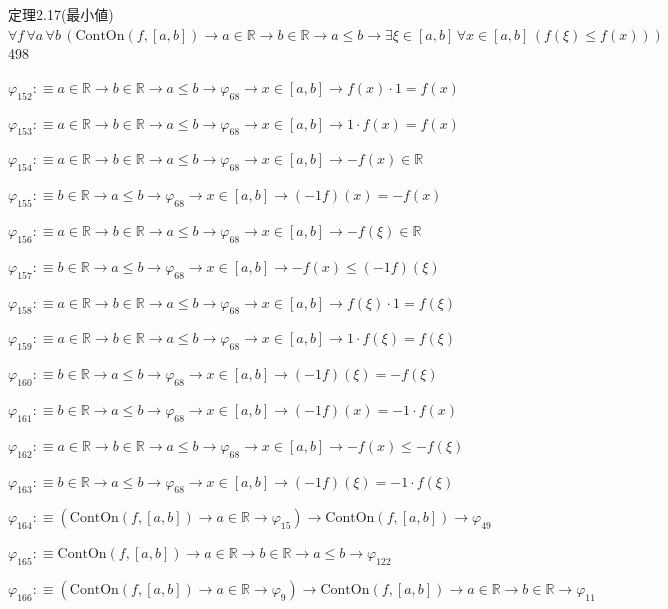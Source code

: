 \begin{fullproof}{定理2.17(最小値)}{$\forall f\,\forall a\,\forall b\,(\mathrm{ContOn}(f,[a,b]) \to a \in \mathbb{R} \to b \in \mathbb{R} \to a \leq b \to \exists \xi \in [a,b]\,\forall x \in [a,b]\,(f(\xi) \leq f(x)))$}{498}
\begin{abbrevlist}
\item $\varphi_{152} :\equiv a \in \mathbb{R} \to b \in \mathbb{R} \to a \leq b \to \varphi_{68} \to x \in [a,b] \to f(x) \cdot 1 = f(x)$
\item $\varphi_{153} :\equiv a \in \mathbb{R} \to b \in \mathbb{R} \to a \leq b \to \varphi_{68} \to x \in [a,b] \to 1 \cdot f(x) = f(x)$
\item $\varphi_{154} :\equiv a \in \mathbb{R} \to b \in \mathbb{R} \to a \leq b \to \varphi_{68} \to x \in [a,b] \to -f(x) \in \mathbb{R}$
\item $\varphi_{155} :\equiv b \in \mathbb{R} \to a \leq b \to \varphi_{68} \to x \in [a,b] \to (-1 f)(x) = -f(x)$
\item $\varphi_{156} :\equiv a \in \mathbb{R} \to b \in \mathbb{R} \to a \leq b \to \varphi_{68} \to x \in [a,b] \to -f(\xi) \in \mathbb{R}$
\item $\varphi_{157} :\equiv b \in \mathbb{R} \to a \leq b \to \varphi_{68} \to x \in [a,b] \to -f(x) \leq (-1 f)(\xi)$
\item $\varphi_{158} :\equiv a \in \mathbb{R} \to b \in \mathbb{R} \to a \leq b \to \varphi_{68} \to x \in [a,b] \to f(\xi) \cdot 1 = f(\xi)$
\item $\varphi_{159} :\equiv a \in \mathbb{R} \to b \in \mathbb{R} \to a \leq b \to \varphi_{68} \to x \in [a,b] \to 1 \cdot f(\xi) = f(\xi)$
\item $\varphi_{160} :\equiv b \in \mathbb{R} \to a \leq b \to \varphi_{68} \to x \in [a,b] \to (-1 f)(\xi) = -f(\xi)$
\item $\varphi_{161} :\equiv b \in \mathbb{R} \to a \leq b \to \varphi_{68} \to x \in [a,b] \to (-1 f)(x) = -1 \cdot f(x)$
\item $\varphi_{162} :\equiv a \in \mathbb{R} \to b \in \mathbb{R} \to a \leq b \to \varphi_{68} \to x \in [a,b] \to -f(x) \leq -f(\xi)$
\item $\varphi_{163} :\equiv b \in \mathbb{R} \to a \leq b \to \varphi_{68} \to x \in [a,b] \to (-1 f)(\xi) = -1 \cdot f(\xi)$
\item $\varphi_{164} :\equiv (\mathrm{ContOn}(f,[a,b]) \to a \in \mathbb{R} \to \varphi_{15}) \to \mathrm{ContOn}(f,[a,b]) \to \varphi_{49}$
\item $\varphi_{165} :\equiv \mathrm{ContOn}(f,[a,b]) \to a \in \mathbb{R} \to b \in \mathbb{R} \to a \leq b \to \varphi_{122}$
\item $\varphi_{166} :\equiv (\mathrm{ContOn}(f,[a,b]) \to a \in \mathbb{R} \to \varphi_{9}) \to \mathrm{ContOn}(f,[a,b]) \to a \in \mathbb{R} \to b \in \mathbb{R} \to \varphi_{11}$

\end{abbrevlist}
\end{fullproof}
